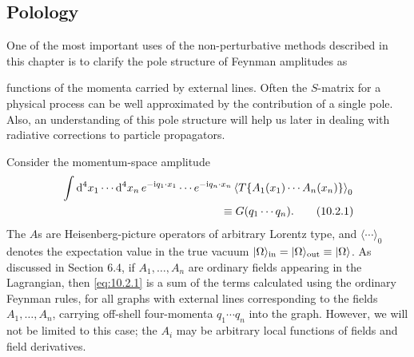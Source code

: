 
\subsection{Polology}

One of the most important uses of the non-perturbative methods described
in this chapter is to clarify the pole structure of Feynman amplitudes as



functions of the momenta carried by external lines. Often the $S$-matrix
for a physical process can be well approximated by the contribution of a
single pole. Also, an understanding of this pole structure will help us later
in dealing with radiative corrections to particle propagators.

Consider the momentum-space amplitude
\begin{align}
  &\int \dd^4x_1\cdots \dd^4x_n\,
  e^{-\ii q_1\cdot x_1}\cdots e^{-\ii q_n\cdot x_n}
  \left\langle T\{A_1(x_1)\cdots A_n(x_n)\}\right\rangle_0
  \notag\\
  &\hspace{5cm}\equiv G(q_1\cdots q_n).
  \tag{10.2.1}\label{eq:10.2.1}
\end{align}
The $A$s are Heisenberg-picture operators of arbitrary Lorentz type, and
$\langle\cdots\rangle_0$ denotes the expectation value in the true vacuum
$\lvert \Omega\rangle_{\mathrm{in}}=\lvert \Omega\rangle_{\mathrm{out}}\equiv\lvert \Omega\rangle$.
As discussed in Section 6.4, if $A_1,\ldots,A_n$ are ordinary fields appearing in
the Lagrangian, then \eqref{eq:10.2.1} is a sum of the terms calculated using the
ordinary Feynman rules, for all graphs with external lines corresponding
to the fields $A_1,\ldots,A_n$, carrying off-shell four-momenta $q_1\cdots q_n$ into the
graph. However, we will not be limited to this case; the $A_i$ may be
arbitrary local functions of fields and field derivatives.

